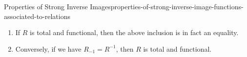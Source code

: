 \begin{proposition}{Properties of Strong Inverse Images}{properties-of-strong-inverse-image-functions-associated-to-relations}
\begin{enumerate}
\begin{enumerate}
                    \[
                        R_{-1}(V)
                        \subset
                        R^{-1}(V)
                    \]%
                    natural in $V\in\mathcal{P}(B)$.
                \item\label{properties-of-strong-inverse-image-functions-associated-to-relations-interaction-with-weak-inverse-images-2-b}If $R$ is total and functional, then the above inclusion is in fact an equality.
                \item\label{properties-of-strong-inverse-image-functions-associated-to-relations-interaction-with-weak-inverse-images-2-c}Conversely, if we have $R_{-1}=R^{-1}$, then $R$ is total and functional.
            \end{enumerate}
    \end{enumerate}
\end{proposition}
